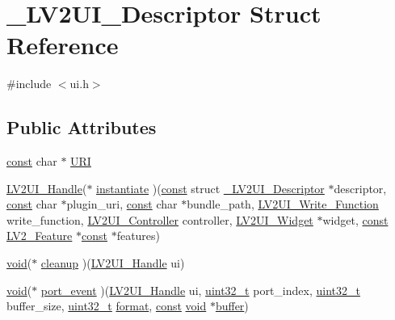 \hypertarget{struct___l_v2_u_i___descriptor}{}\section{\+\_\+\+L\+V2\+U\+I\+\_\+\+Descriptor Struct Reference}
\label{struct___l_v2_u_i___descriptor}


{\ttfamily \#include $<$ui.\+h$>$}

\subsection*{Public Attributes}
\begin{DoxyCompactItemize}
\item 
\hyperlink{getopt1_8c_a2c212835823e3c54a8ab6d95c652660e}{const} char $\ast$ \hyperlink{struct___l_v2_u_i___descriptor_a939d783f0259577dd22df5c95c0372dc}{U\+RI}
\item 
\hyperlink{ui_8h_aea72a15db080a61e5e222fed84047e90}{L\+V2\+U\+I\+\_\+\+Handle}($\ast$ \hyperlink{struct___l_v2_u_i___descriptor_a7a3bfa399c6ee276b096b31f837fc0fb}{instantiate} )(\hyperlink{getopt1_8c_a2c212835823e3c54a8ab6d95c652660e}{const} struct \hyperlink{struct___l_v2_u_i___descriptor}{\+\_\+\+L\+V2\+U\+I\+\_\+\+Descriptor} $\ast$descriptor, \hyperlink{getopt1_8c_a2c212835823e3c54a8ab6d95c652660e}{const} char $\ast$plugin\+\_\+uri, \hyperlink{getopt1_8c_a2c212835823e3c54a8ab6d95c652660e}{const} char $\ast$bundle\+\_\+path, \hyperlink{ui_8h_a62502987d06bc97ea88521aacc0990c9}{L\+V2\+U\+I\+\_\+\+Write\+\_\+\+Function} write\+\_\+function, \hyperlink{ui_8h_a055fb969db1ceb4a345b6548a03c5876}{L\+V2\+U\+I\+\_\+\+Controller} controller, \hyperlink{ui_8h_a45b270c5521300ce914cba64072a568c}{L\+V2\+U\+I\+\_\+\+Widget} $\ast$widget, \hyperlink{getopt1_8c_a2c212835823e3c54a8ab6d95c652660e}{const} \hyperlink{lv2_8h_a78d13b607443404459db283371723234}{L\+V2\+\_\+\+Feature} $\ast$\hyperlink{getopt1_8c_a2c212835823e3c54a8ab6d95c652660e}{const} $\ast$features)
\item 
\hyperlink{sound_8c_ae35f5844602719cf66324f4de2a658b3}{void}($\ast$ \hyperlink{struct___l_v2_u_i___descriptor_ac9f3bd154ae7fabd8348db1b8e223048}{cleanup} )(\hyperlink{ui_8h_aea72a15db080a61e5e222fed84047e90}{L\+V2\+U\+I\+\_\+\+Handle} ui)
\item 
\hyperlink{sound_8c_ae35f5844602719cf66324f4de2a658b3}{void}($\ast$ \hyperlink{struct___l_v2_u_i___descriptor_a4991cb66395db96fbe83058f25c117de}{port\+\_\+event} )(\hyperlink{ui_8h_aea72a15db080a61e5e222fed84047e90}{L\+V2\+U\+I\+\_\+\+Handle} ui, \hyperlink{lib-src_2ffmpeg_2win32_2stdint_8h_a6eb1e68cc391dd753bc8ce896dbb8315}{uint32\+\_\+t} port\+\_\+index, \hyperlink{lib-src_2ffmpeg_2win32_2stdint_8h_a6eb1e68cc391dd753bc8ce896dbb8315}{uint32\+\_\+t} buffer\+\_\+size, \hyperlink{lib-src_2ffmpeg_2win32_2stdint_8h_a6eb1e68cc391dd753bc8ce896dbb8315}{uint32\+\_\+t} \hyperlink{_export_p_c_m_8cpp_a317afff57d87a89158c2b038d37b2b08}{format}, \hyperlink{getopt1_8c_a2c212835823e3c54a8ab6d95c652660e}{const} \hyperlink{sound_8c_ae35f5844602719cf66324f4de2a658b3}{void} $\ast$\hyperlink{structbuffer}{buffer})

\end{DoxyCompactItemize}
